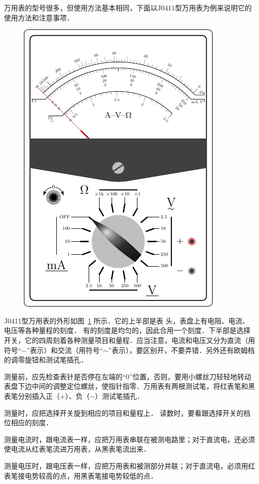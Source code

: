 万用表的型号很多，但使用方法基本相同，下面以J0411型万用表为例来说明它的使用方法和注意事项．
\begin{figure}[htbp]
    \centering
    \includegraphics{fig/B/9-10.pdf}
    \caption{}\label{fig_B_9-10}
\end{figure}

J0411型万用表的外形如图~\ref{fig_B_9-10} 所示．它的上半部是表
头，表盘上有电阻、电流、电压等各种量程的刻度．
有的刻度是均匀的，因此合用一个刻度．下半部是选择开关，它的四周刻着各种测量项目和量程．应当注意，电流和电压又分为直流（用符号“$-$”表示）和交流（用符号“$\sim$”表示），要区别开，不要弄错．另外还有欧姆档的调零旋钮和测试笔插孔．

测量前，应先检查表针是否停在左端的“0”位置，否则，要用小螺丝刀轻轻地转动表盘下边中间的调整定位螺丝，使指针指零．万用表有两根测试笔，将红表笔和黑表笔分别插入正（$+$）、负（$-$）测试笔插孔．

测量时，应把选择开关旋到相应的项目和量程上．
读数时，要看跟选择开关的档位相应的刻度．

测量电流时，跟电流表一样，应把万用表串联在被测电路里；对于直流电，还必须使电流从红表笔流进万用表，从黑表笔流出来．

测量电压时，跟电压表一样，应把万用表和被测部分并联；对于直流电，必须用红表笔接电势较高的点，用黑表笔接电势较低的点．

